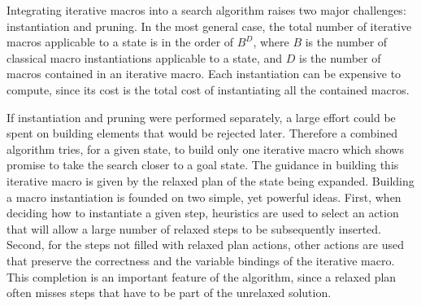 \documentclass{article}
\begin{document}
Integrating iterative macros into a search algorithm raises two 
major challenges: instantiation and pruning.
In the most general case, the total number of iterative macros
applicable to a state is in the order of $B^D$,
where $B$ is the number of classical macro instantiations
applicable to a state, and $D$ is the number of macros
contained in an iterative macro.
Each instantiation can be expensive to compute, since its cost is
the total cost of instantiating all the contained macros.

If instantiation and pruning were performed separately,
a large effort could be spent on building elements that
would be rejected later.
Therefore a combined algorithm tries,
for a given state, to build only one iterative macro which
shows promise to take the search closer to a goal state.
The guidance in building this iterative macro is given
by the relaxed plan of the state being expanded.
Building a macro instantiation is founded on two 
simple, yet powerful ideas.
First, when deciding how to instantiate a given step,
heuristics are used to select an action that will allow
a large number of relaxed steps to be subsequently inserted.
Second, for the steps not filled with relaxed plan actions,
other actions are used that preserve the correctness
and the variable bindings of the iterative macro.
This completion is an important feature of the algorithm, 
since a relaxed plan often 
misses steps that have to be part of the unrelaxed solution.

\def\myif{{\bf if}}
\def\myelse{{\bf else}}
\def\mydo{{\bf do}}
\def\while{{\bf while}}
\def\continue{{\bf continue}}
\def\for{{\bf for}}
\def\return{{\bf return}}
\def\int{{\bf int}}
\def\bool{{\bf bool}}
\def\const{{\bf const}}
\def\void{{\bf void}}
\def\true{{\bf true}}
\def\false{{\bf false}}
\def\break{{\bf break}}
\end{document}

